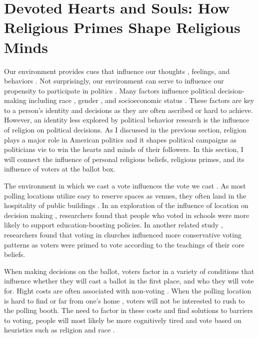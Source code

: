 \documentclass[letterpaper,man,natbib,noextraspace,12pt]{apa6}  %
\begin{document}
\section{Devoted Hearts and Souls: How Religious Primes Shape Religious Minds}

Our environment provides cues that influence our thoughts \citep{kahneman_thinking_2012}, feelings, and behaviors \citep{cialdini_pre-suasion:_2016}. Not surprisingly, our environment can serve to influence our propensity to participate in politics \citep{barreto_are_2009}. Many factors influence political decision-making \citep{gelman_red_2010} including race \citep{mclaughlin_conditioned_2016}, gender \citep{lawless_it_2005}, and socioeconomic status \citep{gilens2012affluence}. These factors are key to a person’s identity and decisions as they are often ascribed or hard to achieve. However, an identity less explored by political behavior research is the influence of religion on political decisions. As I discussed in the previous section, religion plays a major role in American politics and it shapes political campaigns as politicians vie to win the hearts and minds of their followers. In this section, I will connect the influence of personal religious beliefs, religious primes, and its influence of voters at the ballot box. 

The environment in which we cast a vote influences the vote we cast \citep{berger_contextual_2008}. As most polling locations utilize easy to reserve spaces as venues, they often land in the hospitality of public buildings \citep{barreto_are_2009}. In an exploration of the influence of location on decision making \citep{berger_contextual_2008}, researchers found that people who voted in schools were more likely to support education-boosting policies. In another related study \citep{rutchick_deus_2010}, researchers found that voting in churches influenced more conservative voting patterns as voters were primed to vote according to the teachings of their core beliefs. 

When making decisions on the ballot, voters factor in a variety of conditions that influence whether they will cast a ballot in the first place, and who they will vote for. Hight costs are often associated with non-voting \citep{haspel_location_2005}. When the polling location is hard to find \citep{barreto_are_2009} or far from one’s home \citep{haspel_location_2005}, voters will not be interested to rush to the polling booth. The need to factor in these costs and find solutions to barriers to voting, people will most likely be more cognitively tired and vote based on heuristics such as religion and race \citep{weber_courting_2012}. 
\end{document}
